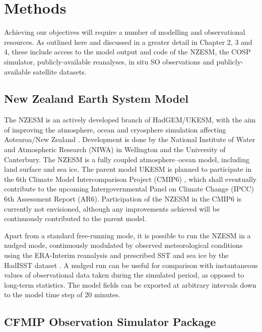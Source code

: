 \section{Methods}

Achieving our objectives will require a number of modelling and
observational resources. As outlined here and discussed in
a greater detail in Chapter 2, 3 and 4, these include access to the model output
and
code of the NZESM, the COSP simulator, publicly-available reanalyses,
 in situ SO observations and publicly-available
satellite datasets.

\subsection{New Zealand Earth System Model}

The NZESM is an actively developed branch of HadGEM/UKESM, with the
aim of improving the atmosphere, ocean and cryosphere simulation affecting
Aotearoa/New Zealand
\citep{williams2016}. Development is done by the National Institute of Water and
Atmospheric Research (NIWA) in Wellington and the University of Canterbury.
The NZESM is a fully coupled atmosphere--ocean model, including land surface
and sea ice. The parent model UKESM \citep{walters2017} is planned to participate
in the 6th Climate Model Intercomparison Project (CMIP6) \citep{eyring2016,meehl2014},
which shall eventually contribute to the upcoming
Intergovernmental Panel on Climate Change (IPCC) 6th
Assessment Report (AR6). Participation of the NZESM in the CMIP6 is currently not
envisioned, although any improvements achieved will be continuously contributed
to the parent model.

Apart from a standard free-running mode, it is possible to run the NZESM
in a nudged mode, continuously modulated by observed meteorological
conditions using the ERA-Interim reanalysis \citep{dee2011} and prescribed SST and sea ice
by the HadISST dataset \citep{rayner2003}.
A nudged run can be useful for comparison with instantaneous values of
observational data taken during the simulated period,
as opposed to long-term statistics. The model fields can be exported
at arbitrary intervals down to the model time step of 20 minutes.

\subsection{CFMIP Observation Simulator Package}

